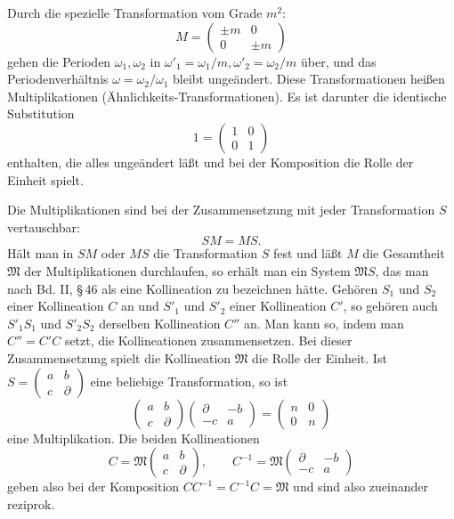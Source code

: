 \documentclass[11pt]{article}
\begin{document}
Durch die spezielle Transformation vom Grade $m^2$:
\[
M=\begin{pmatrix}\pm m&0\\0&\pm m\end{pmatrix}
\]
gehen die Perioden $\omega_1,\omega_2$ in $\omega'_1=\omega_1/m,\omega'_2=\omega_2/m$ über, und das Periodenverhältnis $\omega=\omega_2/\omega_1$ bleibt ungeändert. Diese Transformationen heißen Multiplikationen (Ähnlichkeits-Transformationen). Es ist darunter die identische Substitution
\[
1=\begin{pmatrix}1&0\\0&1\end{pmatrix}
\]
enthalten, die alles ungeändert läßt und bei der Komposition die Rolle der Einheit spielt.

Die Multiplikationen sind bei der Zusammensetzung mit jeder Transformation $S$ vertauschbar:
\begin{equation}
SM=MS. \tag{7}
\end{equation}
Hält man in $SM$ oder $MS$ die Transformation $S$ fest und läßt $M$ die Gesamtheit $\mathfrak M$ der Multiplikationen durchlaufen, so erhält man ein System $\mathfrak M S$, das man nach Bd. II, \S\,46 als eine Kollineation zu bezeichnen hätte. Gehören $S_1$ und $S_2$ einer Kollineation $C$ an und $S'_1$ und $S'_2$ einer Kollineation $C'$, so gehören auch $S'_1S_1$ und $S'_2S_2$ derselben Kollineation $C''$ an. Man kann so, indem man $C''=C'C$ setzt, die Kollineationen zusammensetzen. Bei dieser Zusammensetzung spielt die Kollineation $\mathfrak M$ die Rolle der Einheit. Ist $S=\begin{pmatrix}a&b\\c&\partial\end{pmatrix}$ eine beliebige Transformation, so ist
\[
\begin{pmatrix}a&b\\c&\partial\end{pmatrix}
\begin{pmatrix}\partial&-b\\-c&a\end{pmatrix}
=\begin{pmatrix}n&0\\0&n\end{pmatrix}
\]
eine Multiplikation. Die beiden Kollineationen
\[
C=\mathfrak M\begin{pmatrix}a&b\\c&\partial\end{pmatrix},
\qquad
C^{-1}=\mathfrak M\begin{pmatrix}\partial&-b\\-c&a\end{pmatrix}
\]
geben also bei der Komposition $CC^{-1}=C^{-1}C=\mathfrak M$ und sind also zueinander reziprok.
\end{document}
